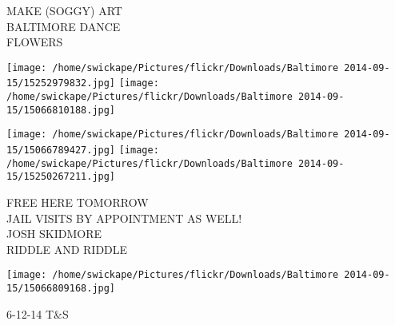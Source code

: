 \documentclass[10pt,letterpaper]{article}
\begin{document}
MAKE (SOGGY) ART\\
BALTIMORE DANCE\\
FLOWERS
\pagebreak

\texttt{[image: /home/swickape/Pictures/flickr/Downloads/Baltimore 2014-09-15/15252979832.jpg]}
\texttt{[image: /home/swickape/Pictures/flickr/Downloads/Baltimore 2014-09-15/15066810188.jpg]}

\texttt{[image: /home/swickape/Pictures/flickr/Downloads/Baltimore 2014-09-15/15066789427.jpg]}
\texttt{[image: /home/swickape/Pictures/flickr/Downloads/Baltimore 2014-09-15/15250267211.jpg]}

FREE HERE TOMORROW\\
JAIL VISITS BY APPOINTMENT AS WELL!\\
JOSH SKIDMORE\\
RIDDLE AND RIDDLE
\pagebreak

\texttt{[image: /home/swickape/Pictures/flickr/Downloads/Baltimore 2014-09-15/15066809168.jpg]}

6{-}12{-}14 T\&S
\pagebreak
\end{document}
